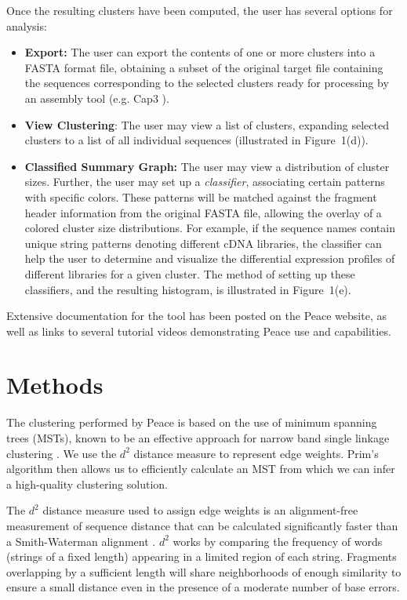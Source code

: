 \documentclass[a4,center,fleqn]{NAR}
\begin{document}
 Once the resulting clusters have been
computed, the user has several options for analysis:
\begin{itemize}
\item {\bf Export:} The user can export the contents of one or more
  clusters into a FASTA format file, obtaining a subset of the original target file
  containing the sequences corresponding to the selected clusters
  ready for processing by an assembly tool (e.g. {\sc Cap3} \cite{Huang99}).
\item {\bf View Clustering}: The user may view a list of clusters,
  expanding selected clusters to a list of all individual sequences (illustrated
  in Figure~1(d)).
\item {\bf Classified Summary Graph:} The user may view a distribution
  of cluster sizes.  Further, the user may set up a {\it classifier},
  associating certain patterns with specific colors.  These patterns
  will be matched against the fragment header information from the
  original FASTA file, allowing the overlay of a colored cluster size
  distributions.  For example, if the sequence names contain unique
  string patterns denoting different cDNA libraries, the classifier
  can help the user to determine and visualize the differential expression profiles
  of different libraries for a given cluster.  The method of setting up these classifiers, and the
  resulting histogram, is illustrated in Figure~1(e).
\end{itemize}
Extensive documentation for the tool has been posted on the {\sc
  Peace} website, as well as links to several tutorial videos demonstrating
{\sc Peace} use and capabilities.


\section{Methods}

The clustering performed by {\sc Peace} is based on the use of minimum
spanning trees (MSTs), known to be an effective approach for narrow
band single linkage clustering \cite{Jain99,Wan08}. We use the $d^2$
distance measure \cite{Hide94} to represent edge weights.  Prim's
algorithm \cite{Prim57} then allows us to efficiently calculate an
MST from which we can infer a high-quality clustering solution.

The $d^2$ distance measure used to assign edge weights is an
alignment-free measurement of sequence distance that can be calculated
significantly faster than a Smith-Waterman alignment \cite{Hide94}.
$d^2$ works by comparing the frequency of words (strings of a fixed
length) appearing in a limited region of each string.  Fragments
overlapping by a sufficient length will share neighborhoods of enough
similarity to ensure a small distance even in the presence of a
moderate number of base errors.
\end{document}
